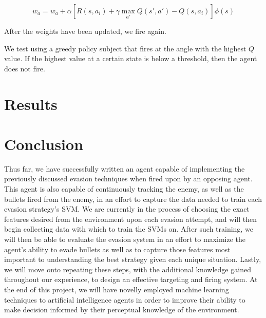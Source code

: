 \documentclass{article}
\theoremstyle{plain}
\theoremstyle{definition}
\theoremstyle{remark}
\begin{document}
$$w_a = w_a + \alpha\left[R(s, a_i) + \gamma\max_{a'}Q(s', a') - Q(s, a_i)\right]\phi(s)$$

After the weights have been updated, we fire again.

We test using a greedy policy subject that fires at the angle with the highest $Q$ value. If the highest value at a certain state is below a threshold, then
the agent does not fire.

\section{Results}


\section{Conclusion}

Thus far, we have successfully written an agent capable of implementing the previously discussed evasion techniques when fired upon by an opposing agent. This agent is also capable of continuously tracking the enemy, as well as the bullets fired from the enemy, in an effort to capture the data needed to train each evasion strategy's SVM. We are currently in the process of choosing the exact features desired from the environment upon each evasion attempt, and will then begin collecting data with which to train the SVMs on. After such training, we will then be able to evaluate the evasion system in an effort to maximize the agent's ability to evade bullets as well as to capture those features most important to understanding the best strategy given each unique situation. Lastly, we will move onto repeating these steps, with the additional knowledge gained throughout our experience, to design an effective targeting and firing system. At the end of this project, we will have novelly employed machine learning techniques to artificial intelligence agents in order to improve their ability to make decision informed by their perceptual knowledge of the environment.



\end{document}
